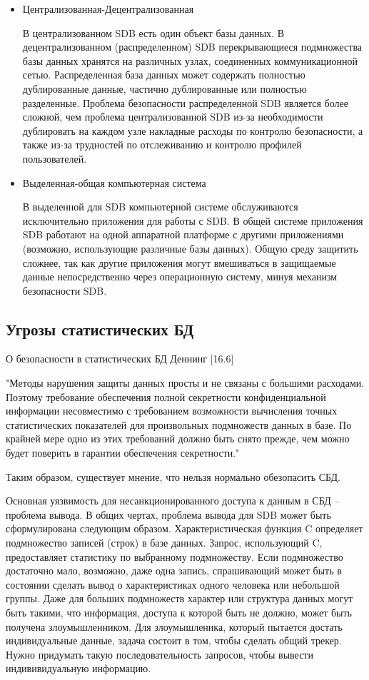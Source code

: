 \begin{itemize}
    \item Централизованная-Децентрализованная

В централизованном SDB есть один объект базы данных. В децентрализованном (распределенном) SDB перекрывающиеся подмножества базы данных хранятся на различных узлах, соединенных коммуникационной сетью. Распределенная база данных может содержать полностью дублированные данные, частично дублированные или полностью разделенные. Проблема безопасности распределенной SDB является более сложной, чем проблема централизованной SDB из-за необходимости дублировать на каждом узле накладные расходы по контролю безопасности, а также из-за трудностей по отслеживанию и контролю профилей пользователей.

	\item Выделенная-общая компьютерная система

В выделенной для SDB компьютерной системе обслуживаются исключительно приложения для работы с SDB. В общей системе приложения SDB работают на одной аппаратной платформе с другими приложениями (возможно, использующие различные базы данных). Общую среду защитить сложнее, так как другие приложения могут вмешиваться в защищаемые данные непосредственно через операционную систему, минуя механизм безопасности SDB.
\end{itemize}
\subsection{Угрозы статистических БД}

О безопасности в статистических БД  Деннинг [16.6]
\begin{grayquote}
"Методы нарушения защиты данных просты и не связаны с большими расходами. Поэтому требование обеспечения полной секретности конфиденциальной информации несовместимо с требованием возможности вычисления точных статистических показателей для произвольных подмножеств данных в базе. По крайней мере одно из этих требований должно быть снято прежде, чем можно будет поверить в гарантии обеспечения секретности."
\end{grayquote}
Таким образом, существует мнение, что нельзя нормально обезопасить СБД.

Основная уязвимость для несанкционированного доступа к данным в СБД -- проблема вывода.
В общих чертах, проблема вывода для SDB может быть сформулирована следующим образом. Характеристическая функция C определяет подмножество записей (строк) в базе данных. Запрос, использующий C, предоставляет статистику по выбранному подмножеству. Если подмножество достаточно мало, возможно, даже одна запись, спрашивающий может быть в состоянии сделать вывод о характеристиках одного человека или небольшой группы. Даже для больших подмножеств характер или структура данных могут быть такими, что информация, доступа к которой быть не должно, может быть получена злоумышленником.
Для злоумышленика, который пытается достать индивидуальные данные, задача состоит в том, чтобы сделать общий трекер.
Нужно придумать такую последовательность запросов, чтобы вывести индививидуальную информацию.

